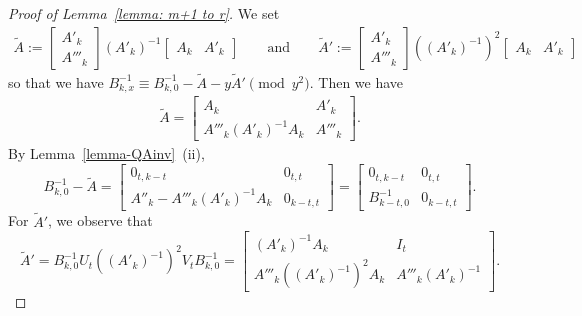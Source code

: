 \documentclass[10pt,a4paper]{amsart}
\begin{document}
\begin{proof}[Proof of Lemma~\ref{lemma: m+1 to r}]
We set
    \begin{align*}
        \tilde A
        :=
        \begin{bmatrix}
            A'_k \\
            A'''_k
        \end{bmatrix}
        (A'_k)^{-1}
        \begin{bmatrix}
            A_k & A'_k
        \end{bmatrix}
        \qquad\mbox{and}\qquad
        \tilde A'
        :=
        \begin{bmatrix}
            A'_k \\
            A'''_k
        \end{bmatrix}
        ((A'_k)^{-1})^2
        \begin{bmatrix}
            A_k & A'_k
        \end{bmatrix}
    \end{align*}
so that we have $B_{k,x}^{-1}\equiv B_{k,0}^{-1}-\tilde A-y\tilde A' \pmod{y^2}$. Then we have
    \begin{align*}
        \tilde A
        =
        \begin{bmatrix}
            A_k & A'_k \\
            A'''_k(A'_k)^{-1}A_k & A'''_k
        \end{bmatrix}.
    \end{align*}
By Lemma~\ref{lemma-QAinv}~(ii),
    \begin{equation}\label{eq: inverse of B_k,x-tilde A}
        B_{k,0}^{-1}-\tilde A
        =
        \begin{bmatrix}
            0_{t,k-t} & 0_{t,t} \\
            A''_k-A'''_k(A'_k)^{-1}A_k & 0_{k-t,t}
        \end{bmatrix}
        =
        \begin{bmatrix}
            0_{t,k-t} & 0_{t,t} \\
            B_{k-t,0}^{-1} & 0_{k-t,t}
        \end{bmatrix}.
    \end{equation}
For $\tilde A'$, we observe that
    \begin{equation}\label{eq: tilde A prime}
        \tilde A'
        =B_{k,0}^{-1}U_t((A'_k)^{-1})^2V_tB_{k,0}^{-1}=
        \begin{bmatrix}
            (A'_k)^{-1}A_k & I_t \\
            A'''_k((A'_k)^{-1})^2A_k & A'''_k(A'_k)^{-1}
        \end{bmatrix}.

\end{equation}
\end{proof}
\end{document}
